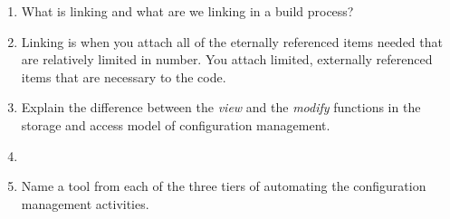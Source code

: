\documentclass[11pt]{article}
\begin{document}
\begin{enumerate}
    \item What is linking and what are we linking in a build process?
    \item[] Linking is when you attach all of the eternally referenced items needed that are relatively limited in number. You attach limited, externally referenced items that are necessary to the code.
    
    \item Explain the difference between the \textit{view} and the \textit{modify} functions in the storage and access model of configuration management.
    \item[] 
    
    \item Name a tool from each of the three tiers of automating the configuration management activities.
    
    
    \end{enumerate}
    
    
\end{document}
